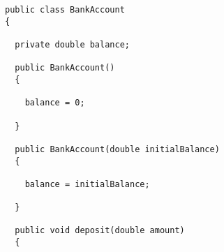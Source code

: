 \documentclass[12pt]{article}
\begin{document}
\begin{enumerate}









\newpage

\begin{figure}[t]

\footnotesize{
\begin{verbatim}
public class BankAccount
{

  private double balance;

  public BankAccount()
  {

    balance = 0;

  }

  public BankAccount(double initialBalance)
  {

    balance = initialBalance;

  }

  public void deposit(double amount)
  {


\end{verbatim}}
\end{figure}
\end{enumerate}
\end{document}
